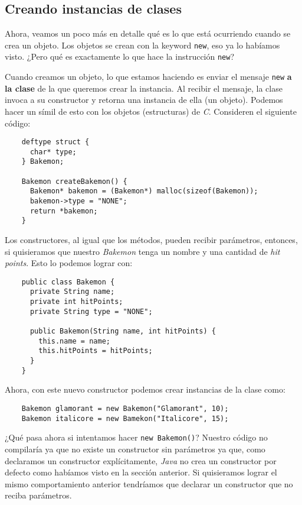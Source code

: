 \subsection{Creando instancias de clases}
  Ahora, veamos un poco más en detalle qué es lo que está ocurriendo cuando se crea un objeto.
  Los objetos se crean con la keyword \texttt{new}, eso ya lo habíamos visto. 
  ¿Pero qué es exactamente lo que hace la instrucción \texttt{new}?

  Cuando creamos un objeto, lo que estamos haciendo es enviar el mensaje \texttt{new} 
  \textbf{a la clase} de la que queremos crear la instancia.
  Al recibir el mensaje, la clase invoca a su constructor y retorna una instancia de ella (un 
  objeto).
  Podemos hacer un símil de esto con los objetos (estructuras) de \textit{C}.
  Consideren el siguiente código:

  \begin{verbatim}
    deftype struct {
      char* type;
    } Bakemon;

    Bakemon createBakemon() {
      Bakemon* bakemon = (Bakemon*) malloc(sizeof(Bakemon));
      bakemon->type = "NONE";
      return *bakemon;
    }
  \end{verbatim}

  Los constructores, al igual que los métodos, pueden recibir parámetros, entonces, si quisieramos 
  que nuestro \textit{Bakemon} tenga un nombre y una cantidad de \textit{hit points}. 
  Esto lo podemos lograr con:

  \begin{verbatim}
    public class Bakemon {
      private String name;
      private int hitPoints;
      private String type = "NONE";

      public Bakemon(String name, int hitPoints) {
        this.name = name;
        this.hitPoints = hitPoints;
      }
    }
  \end{verbatim}

  Ahora, con este nuevo constructor podemos crear instancias de la clase como:
  \begin{verbatim}
    Bakemon glamorant = new Bakemon("Glamorant", 10);
    Bakemon italicore = new Bamekon("Italicore", 15);
  \end{verbatim}

  ¿Qué pasa ahora si intentamos hacer \texttt{new Bakemon()}?
  Nuestro código no compilaría ya que no existe un constructor sin parámetros ya que, como 
  declaramos un constructor explícitamente, \textit{Java} no crea un constructor por defecto como
  habíamos visto en la sección anterior.
  Si quisieramos lograr el mismo comportamiento anterior tendríamos que declarar un constructor que
  no reciba parámetros.


